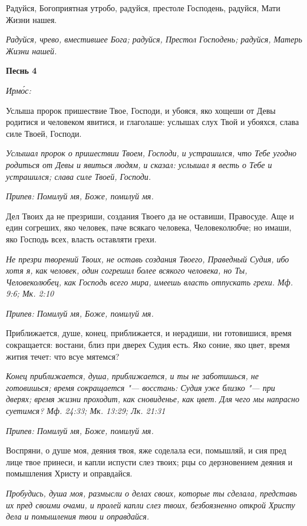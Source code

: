 Радуйся, Богоприятная утробо, радуйся, престоле Господень, радуйся, Мати Жизни нашея.


\itshape Радуйся, чрево, вместившее Бога; радуйся, Престол Господень; радуйся, Матерь Жизни нашей.\normalfont{}





\bfseries Песнь 4\normalfont{}


\itshape Ирмо́с:\normalfont{}


Услыша пророк пришествие Твое, Господи, и убояся, яко хощеши от Девы родитися и человеком явитися, и глаголаше: услышах слух Твой и убояхся, слава силе Твоей, Господи.


\itshape Услышал пророк о пришествии Твоем, Господи, и устрашился, что Тебе угодно родиться от Девы и явиться людям, и сказал: услышал я весть о Тебе и устрашился; слава силе Твоей, Господи.\normalfont{}


\itshape Припев:\normalfont{} Помилуй мя, Боже, помилуй мя.


Дел Твоих да не презриши, создания Твоего да не оставиши, Правосуде. Аще и един согреших, яко человек, паче всякаго человека, Человеколюбче; но имаши, яко Господь всех, власть оставляти грехи.


\itshape Не презри творений Твоих, не оставь создания Твоего, Праведный Судия, ибо хотя я, как человек, один согрешил более всякого человека, но Ты, Человеколюбец, как Господь всего мира, имеешь власть отпускать грехи. Мф. 9:6; Мк. 2:10\normalfont{}


\itshape Припев:\normalfont{} Помилуй мя, Боже, помилуй мя.


Приближается, душе, конец, приближается, и нерадиши, ни готовишися, время сокращается: востани, близ при дверех Судия есть. Яко соние, яко цвет, время жития течет: что всуе мятемся?


\itshape Конец приближается, душа, приближается, и ты не заботишься, не готовишься; время сокращается "--- восстань: Судия уже близко "--- при дверях; время жизни проходит, как сновиденье, как цвет. Для чего мы напрасно суетимся? Мф. 24:33; Мк. 13:29; Лк. 21:31\normalfont{}


\itshape Припев:\normalfont{} Помилуй мя, Боже, помилуй мя.


Воспряни, о душе моя, деяния твоя, яже соделала еси, помышляй, и сия пред лице твое принеси, и капли испусти слез твоих; рцы со дерзновением деяния и помышления Христу и оправдайся.


\itshape Пробудись, душа моя, размысли о делах своих, которые ты сделала, представь их пред своими очами, и пролей капли слез твоих, безбоязненно открой Христу дела и помышления твои и оправдайся.\normalfont{}


